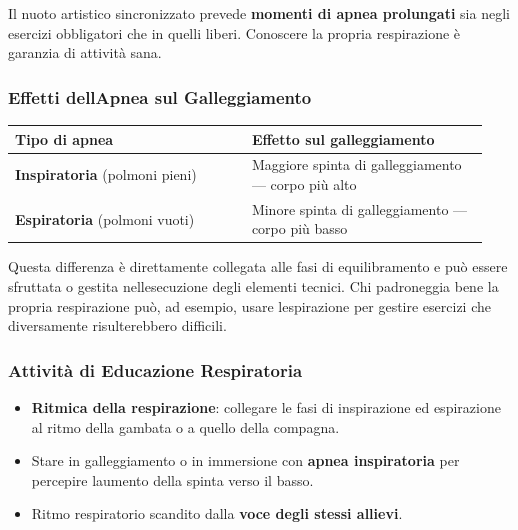 \documentclass[a4paper,11pt]{article}
\providecommand{\tightlist}{%
  \setlength{\itemsep}{0pt}\setlength{\parskip}{0pt}}
\begin{document}
Il nuoto artistico sincronizzato prevede \textbf{momenti di apnea
      prolungati} sia negli esercizi obbligatori che in quelli liberi.
Conoscere la propria respirazione è garanzia di attività sana.

\subsubsection{Effetti dell\textquotesingle Apnea sul
      Galleggiamento}\label{effetti-dellapnea-sul-galleggiamento}

\begin{longtable}[]{@{}p{0.47\linewidth}p{0.47\linewidth}@{}}
      \toprule\noalign{}
      Tipo di apnea                         & Effetto sul galleggiamento      \\
      \midrule\noalign{}
      \endhead
      \bottomrule\noalign{}
      \endlastfoot
      \textbf{Inspiratoria} (polmoni pieni) & Maggiore spinta di
      galleggiamento --- corpo più alto                                       \\
      \textbf{Espiratoria} (polmoni vuoti)  & Minore spinta di galleggiamento
      --- corpo più basso                                                     \\
\end{longtable}

Questa differenza è direttamente collegata alle fasi di equilibramento e
può essere sfruttata o gestita nell\textquotesingle esecuzione degli
elementi tecnici. Chi padroneggia bene la propria respirazione può, ad
esempio, usare l\textquotesingle espirazione per gestire esercizi che
diversamente risulterebbero difficili.

\subsubsection{Attività di Educazione
      Respiratoria}\label{attivituxe0-di-educazione-respiratoria}

\begin{itemize}
      \tightlist
      \item
            \textbf{Ritmica della respirazione}: collegare le fasi di inspirazione
            ed espirazione al ritmo della gambata o a quello della compagna.
      \item
            Stare in galleggiamento o in immersione con \textbf{apnea
                  inspiratoria} per percepire l\textquotesingle aumento della spinta
            verso il basso.
      \item
            Ritmo respiratorio scandito dalla \textbf{voce degli stessi allievi}.
\end{itemize}
\end{document}
